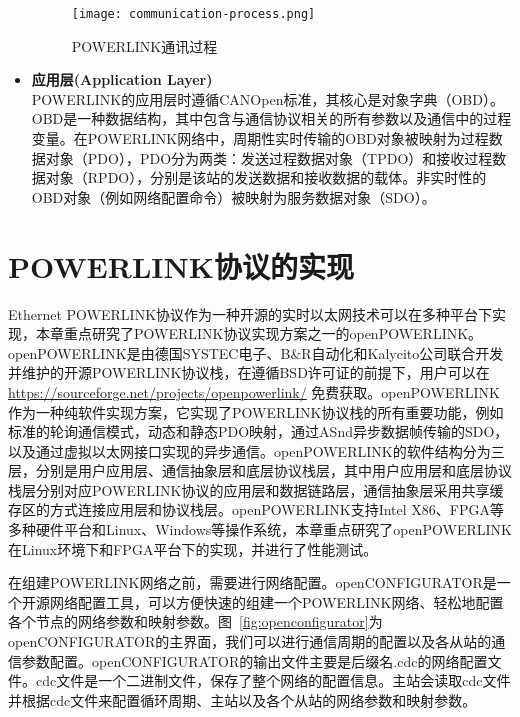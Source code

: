 \begin{itemize}
\begin{figure}[!htb]
  \centering
  \texttt{[image: communication-process.png]}
  \caption{POWERLINK通讯过程}
  \label{fig:communication-process}
\end{figure}

\item \textbf{应用层(Application Layer)} \\ 
POWERLINK的应用层时遵循CANOpen标准，其核心是对象字典（OBD）\cite{jin2012}。OBD是一种数据结构，其中包含与通信协议相关的所有参数以及通信中的过程变量。在POWERLINK网络中，周期性实时传输的OBD对象被映射为过程数据对象（PDO），PDO分为两类：发送过程数据对象（TPDO）和接收过程数据对象（RPDO），分别是该站的发送数据和接收数据的载体。非实时性的OBD对象（例如网络配置命令）被映射为服务数据对象（SDO）。

\end{itemize}

\section{POWERLINK协议的实现}

Ethernet POWERLINK协议作为一种开源的实时以太网技术可以在多种平台下实现，本章重点研究了POWERLINK协议实现方案之一的openPOWERLINK。openPOWERLINK是由德国SYSTEC电子、B$\&$R自动化和Kalycito公司联合开发并维护的开源POWERLINK协议栈，在遵循BSD许可证的前提下，用户可以在 \url{https://sourceforge.net/projects/openpowerlink/} 免费获取。openPOWERLINK作为一种纯软件实现方案，它实现了POWERLINK协议栈的所有重要功能，例如标准的轮询通信模式，动态和静态PDO映射，通过ASnd异步数据帧传输的SDO，以及通过虚拟以太网接口实现的异步通信\cite{oplk}。openPOWERLINK的软件结构分为三层，分别是用户应用层、通信抽象层和底层协议栈层，其中用户应用层和底层协议栈层分别对应POWERLINK协议的应用层和数据链路层，通信抽象层采用共享缓存区的方式连接应用层和协议栈层。openPOWERLINK支持Intel X86、FPGA等多种硬件平台和Linux、Windows等操作系统，本章重点研究了openPOWERLINK在Linux环境下和FPGA平台下的实现，并进行了性能测试。

在组建POWERLINK网络之前，需要进行网络配置。openCONFIGURATOR是一个开源网络配置工具\cite{openCONFIGURATOR}，可以方便快速的组建一个POWERLINK网络、轻松地配置各个节点的网络参数和映射参数。图~\ref{fig:openconfigurator}为openCONFIGURATOR的主界面，我们可以进行通信周期的配置以及各从站的通信参数配置。openCONFIGURATOR的输出文件主要是后缀名.cdc的网络配置文件。cdc文件是一个二进制文件，保存了整个网络的配置信息。主站会读取cdc文件并根据cdc文件来配置循环周期、主站以及各个从站的网络参数和映射参数。

